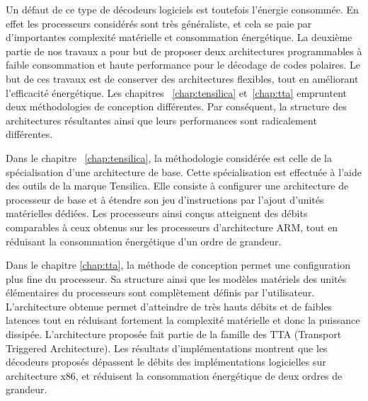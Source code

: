 Un défaut de ce type de décodeurs logiciels est toutefois l'énergie consommée. En effet les processeurs considérés sont très généraliste, et cela se paie par d'importantes complexité matérielle et consommation énergétique. La deuxième partie de nos travaux a pour but de proposer deux architectures programmables à faible consommation et haute performance pour le décodage de codes polaires. Le but de ces travaux est de conserver des architectures flexibles, tout en améliorant l'efficacité énergétique. Les chapitres ~\ref{chap:tensilica} et~\ref{chap:tta} empruntent deux méthodologies de conception différentes. Par conséquent, la structure des architectures résultantes ainsi que leurs performances sont radicalement différentes.

Dans le chapitre ~\ref{chap:tensilica}, la méthodologie considérée est celle de la spécialisation d'une architecture de base. Cette spécialisation est effectuée à l'aide des outils de la marque Tensilica. Elle consiste à configurer une architecture de processeur de base et à étendre son jeu d'instructions par l'ajout d'unités matérielles dédiées. Les processeurs ainsi conçus atteignent des débits comparables à ceux obtenus sur les processeurs d'architecture ARM, tout en réduisant la consommation énergétique d'un ordre de grandeur. 

Dans le chapitre \ref{chap:tta}, la méthode de conception permet une configuration plus fine du processeur. Sa structure ainsi que les modèles matériels des unités élémentaires du processeurs sont complètement définis par l'utilisateur. L'architecture obtenue permet d'atteindre de très hauts débits et de faibles latences tout en réduisant fortement la complexité matérielle et donc la puissance dissipée. L'architecture proposée fait partie de la famille des TTA (Transport Triggered Architecture). Les résultats d'implémentations montrent que les décodeurs proposés dépassent le débits des implémentations logicielles sur architecture x86, et réduisent la consommation énergétique de deux ordres de grandeur.

\clearpage

